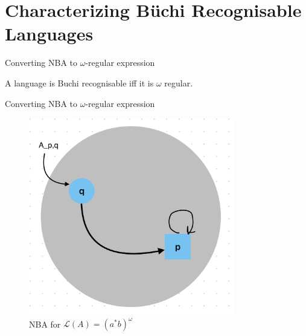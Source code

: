 \documentclass[14pts]{beamer}
\begin{document}
  \section{Characterizing Büchi Recognisable Languages}
    \begin{frame}{Converting NBA to $\omega$-regular expression}
      \begin{theorem}
        A language is Buchi recognisable iff it is $\omega$ regular.
      \end{theorem}
    \end{frame}
    \begin{frame}{Converting NBA to $\omega$-regular expression}
      \begin{figure}
        \centering
        \includegraphics[width=0.8\textwidth]{photo1.png}
        \caption{NBA for $\mathcal{L}(A) = (a^*b)^{\omega}$}
      \end{figure}
    \end{frame}
\end{document}
